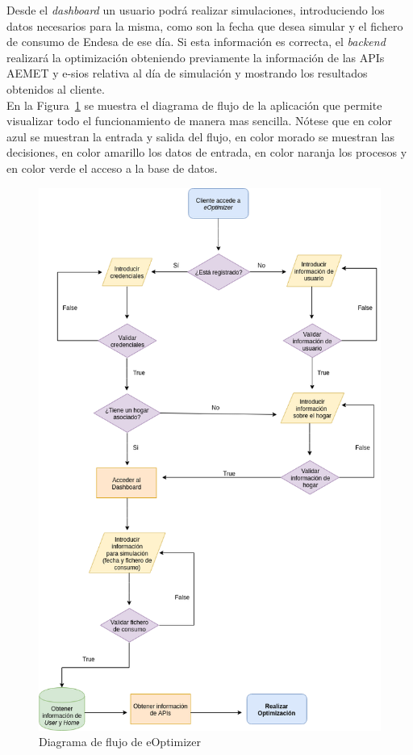 Desde el \textit{dashboard} un usuario podrá realizar simulaciones, introduciendo los datos necesarios para la misma, como son la fecha que desea simular y el fichero de consumo de Endesa de ese día. Si esta información es correcta, el \textit{backend} realizará la optimización obteniendo previamente la información de las APIs AEMET y e-sios relativa al día de simulación y mostrando los resultados obtenidos al cliente.\\

En la Figura~\ref{fig:diagrama-flujo} se muestra el diagrama de flujo de la aplicación que permite visualizar todo el funcionamiento de manera mas sencilla. Nótese que en color azul se muestran la entrada y salida del flujo, en color morado se muestran las decisiones, en color amarillo los datos de entrada, en color naranja los procesos y en color verde el acceso a la base de datos.\\
\begin{figure}[H]
            \centering
            \includegraphics[width=15cm]{figs/diagrama_flujo.png}
            \caption{Diagrama de flujo de eOptimizer}
            \label{fig:diagrama-flujo}
\end{figure}


